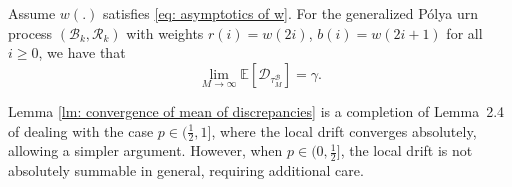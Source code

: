 \documentclass[EJP]{ejpecp} %
\begin{document}
\begin{lemma} \label{lm: convergence of mean of discrepancies}
	Assume $w(.)$ satisfies \eqref{eq: asymptotics of w}.
	For the generalized P\'{o}lya urn process $(\mathscr{B}_{k},\mathscr{R}_{k})$ with weights $r(i)= w(2i)$, $b(i) = w(2i+1)$ for all $i\geq 0$, we have that
	\[
	\lim_{M\to\infty} \mathbb{E}[\mathscr{D}_{\tau_M^{\mathscr{B}}}] = \gamma. 
	\]
\end{lemma} 
\begin{remark}
	Lemma \ref{lm: convergence of mean of discrepancies} is a completion of Lemma~2.4 of \cite{KMP23} dealing with the case ${p \in (\frac{1}{2}, 1]}$, where the local drift converges absolutely, allowing a simpler argument. However, when $p \in (0,\frac{1}{2}]$, the local drift is not absolutely summable in general, requiring additional care.
\end{remark}
\end{document}
